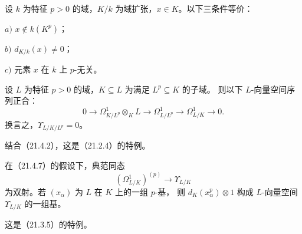 设 $k$ 为特征 $p>0$ 的域，$K/k$ 为域扩张，$x\in K$。以下三条件等价：

$a)$ $x\notin k(K^p)$；

$b)$ $d_{K/k}(x)\ne0$；

$c)$ 元素 $x$ 在 $k$ 上 $p$-无关。

设 $L$ 为特征 $p>0$ 的域，$K\subseteq L$ 为满足 $L^p\subseteq K$ 的子域。
则以下 $L$-向量空间序列正合：
\begin{equation}
 0\longrightarrow\Omega^1_{K/L^p}\otimes_K L
 \longrightarrow\Omega^1_{L/L^p}
 \longrightarrow\Omega^1_{L/K}\longrightarrow0.
 \tag{21.4.7.1}
\end{equation}
换言之，$\Upsilon_{L/K/L^p}=0$。

结合（21.4.2），这是（21.2.4）的特例。

在（21.4.7）的假设下，典范同态
\begin{equation}
 (\Omega^1_{L/K})^{(p)}\longrightarrow\Upsilon_{L/K}
 \tag{21.4.8.1}
\end{equation}
为双射。若 $(x_\alpha)$ 为 $L$ 在 $K$ 上的一组 $p$-基，
则 $d_K(x_\alpha^p)\otimes1$ 构成 $L$-向量空间 $\Upsilon_{L/K}$ 的一组基。

这是（21.3.5）的特例。
